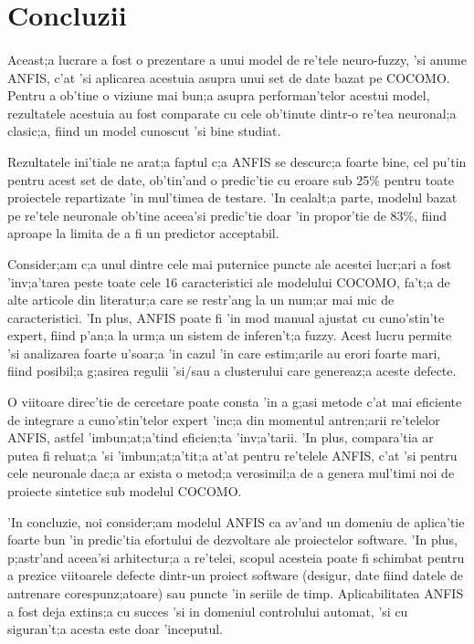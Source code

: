 \section{Concluzii}
\paragraph{}

Aceast;a lucrare a fost o prezentare a unui model de re'tele neuro-fuzzy, 'si anume ANFIS, c'at 'si aplicarea acestuia asupra unui set de date bazat pe COCOMO. Pentru a ob'tine o viziune mai bun;a asupra performan'telor acestui model, rezultatele acestuia au fost comparate cu cele ob'tinute dintr-o re'tea neuronal;a clasic;a, fiind un model cunoscut 'si bine studiat.
\par
Rezultatele ini'tiale ne arat;a faptul c;a ANFIS se descurc;a foarte bine, cel pu'tin pentru acest set de date, ob'tin'and o predic'tie cu eroare sub 25\% pentru toate proiectele repartizate 'in mul'timea de testare. 'In cealalt;a parte, modelul bazat pe re'tele neuronale ob'tine aceea'si predic'tie doar 'in propor'tie de 83\%, fiind aproape la limita de a fi un predictor acceptabil.
\par
Consider;am c;a unul dintre cele mai puternice puncte ale acestei lucr;ari a fost 'inv;a'tarea peste toate cele 16 caracteristici ale modelului COCOMO, fa't;a de alte articole din literatur;a care se restr'ang la un num;ar mai mic de caracteristici. 'In plus, ANFIS poate fi 'in mod manual ajustat cu cuno'stin'te expert, fiind p'an;a la urm;a un sistem de inferen't;a fuzzy. Acest lucru permite 'si analizarea foarte u'soar;a 'in cazul 'in care estim;arile au erori foarte mari, fiind posibil;a g;asirea regulii 'si/sau a clusterului care genereaz;a aceste defecte.
\par
O viitoare direc'tie de cercetare poate consta 'in a g;asi metode c'at mai eficiente de integrare a cuno'stin'telor expert 'inc;a din momentul antren;arii re'telelor ANFIS, astfel 'imbun;at;a'tind eficien;ta 'inv;a'tarii. 'In plus, compara'tia ar putea fi reluat;a 'si 'imbun;at;a'tit;a at'at pentru re'telele ANFIS, c'at 'si pentru cele neuronale dac;a ar exista o metod;a verosimil;a de a genera mul'timi noi de proiecte sintetice sub modelul COCOMO.
\par
'In concluzie, noi consider;am modelul ANFIS ca av'and un domeniu de aplica'tie foarte bun 'in predic'tia efortului de dezvoltare ale proiectelor software. 'In plus, p;astr'and aceea'si arhitectur;a a re'telei, scopul acesteia poate fi schimbat pentru a prezice viitoarele defecte dintr-un proiect software (desigur, date fiind datele de antrenare corespunz;atoare) sau puncte 'in seriile de timp. Aplicabilitatea ANFIS a fost deja extins;a cu succes 'si in domeniul controlului automat, 'si cu siguran't;a acesta este doar 'inceputul.
